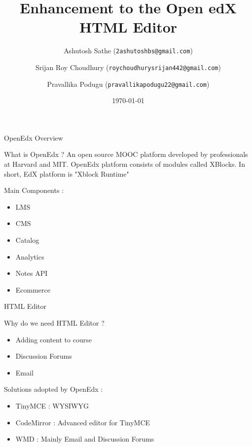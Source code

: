 \documentclass{beamer}
\title{Enhancement to the Open edX HTML Editor}
\date{\today}
\author{
	Ashutosh Sathe
	(\texttt{2ashutoshbs@gmail.com}) \\
	\and
	Srijan Roy Choudhury
	(\texttt{roychoudhurysrijan442@gmail.com}) \\
	\and
	Pravallika Podugu
	(\texttt{pravallikapodugu22@gmail.com}) \\
}
\begin{document}
	\maketitle

	\begin{frame}{OpenEdx Overview}
		\begin{block}{What is OpenEdx ?}
			An open source MOOC platform developed by professionals at Harvard and MIT.
			OpenEdx platform consists of modules called XBlocks. In short, EdX platform is "Xblock Runtime"
		\end{block}
		\begin{block}{Main Components : }
			\begin{itemize}
				\item LMS
				\item CMS
				\item Catalog
				\item Analytics
				\item Notes API
				\item Ecommerce
			\end{itemize}
		\end{block}
	\end{frame}
	
	\begin{frame}{ HTML Editor }
		\begin{block}{Why do we need HTML Editor ?}
			\begin{itemize}
				\item Adding content to course
				\item Discussion Forums
				\item Email
			\end{itemize}
		\end{block}
		\begin{block}{Solutions adopted by OpenEdx : }
			\begin{itemize}
				\item TinyMCE : WYSIWYG
				\item CodeMirror : Advanced editor for TinyMCE
				\item WMD : Mainly Email and Discussion Forums
			\end{itemize}
		\end{block}
	\end{frame}
	
\end{document}
